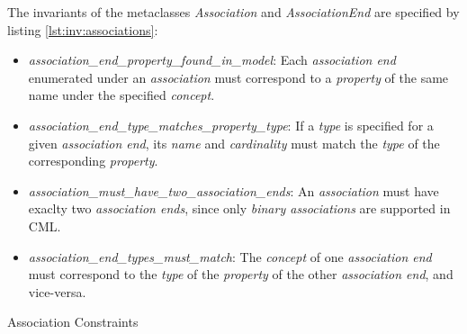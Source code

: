 The invariants of the metaclasses \emph{Association} and \emph{AssociationEnd}
are specified by listing \ref{lst:inv:associations}:

\begin{itemize}

\item \emph{association\_end\_property\_found\_in\_model}:
Each \emph{association end} enumerated under an \emph{association}
must correspond to a \emph{property} of the same name under the specified \emph{concept}.

\item \emph{association\_end\_type\_matches\_property\_type}:
If a \emph{type} is specified for a given \emph{association end},
its \emph{name} and \emph{cardinality} must match the \emph{type}
of the corresponding \emph{property}.

\item \emph{association\_must\_have\_two\_association\_ends}:
An \emph{association} must have exaclty two \emph{association ends},
since only \emph{binary associations} are supported in CML.

\item \emph{association\_end\_types\_must\_match}:
The \emph{concept} of one \emph{association end} must correspond
to the \emph{type} of the \emph{property} of the other \emph{association end},
and vice-versa.

\end{itemize}

\begin{code}

\caption{Association Constraints}
\label{lst:inv:associations}
\end{code}
